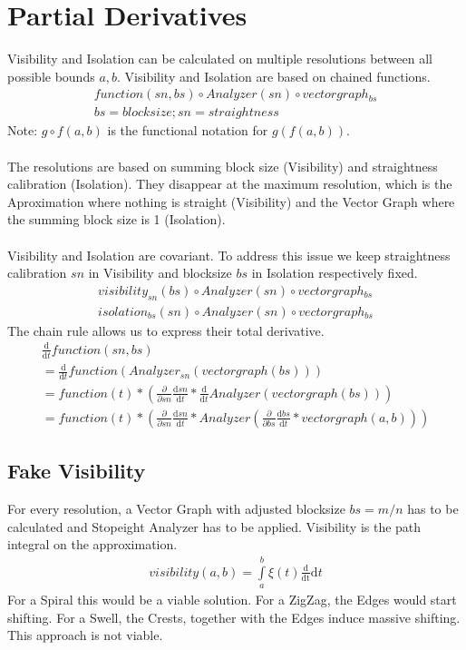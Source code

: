 \documentclass{report}
\begin{document}
\chapter{Partial Derivatives}
Visibility and Isolation can be calculated on multiple resolutions between all possible bounds $a,b$.
Visibility and Isolation are based on chained functions.
\begin{align*}
function(sn,bs) \circ Analyzer(sn) \circ vectorgraph_{bs}\\
bs=blocksize;sn=straightness
\end{align*}
Note: $g \circ f(a,b)$ is the functional notation for $g(f(a,b))$.\\\\
The resolutions are based on summing block size (Visibility) and straightness calibration (Isolation). They disappear at the maximum resolution, which is the Aproximation where nothing is straight (Visibility) and the Vector Graph where the summing block size is 1 (Isolation).\\\\
Visibility and Isolation are covariant. To address this issue we keep straightness calibration $sn$ in Visibility and blocksize $bs$ in Isolation respectively fixed.
\begin{align}
visibility_{sn}(bs) \circ Analyzer(sn) \circ vectorgraph_{bs}\\
isolation_{bs}(sn) \circ Analyzer(sn) \circ vectorgraph_{bs}
\end{align}
The chain rule allows us to express their total derivative.
\begin{align}
\frac{\mathrm{d}}{\mathrm{d} t} function (sn,bs)\\
= \frac{\mathrm{d}}{\mathrm{d} t} function (Analyzer_{sn}(vectorgraph(bs)))\\
= function(t)* (\frac{\partial}{\partial sn}  \frac{\mathrm{d} sn}{\mathrm{d}t} * \frac{\mathrm{d}}{\mathrm{d} t}Analyzer(vectorgraph(bs)))\\
= function(t)* (\frac{\partial}{\partial sn}  \frac{\mathrm{d} sn}{\mathrm{d}t} * Analyzer(\frac{\partial}{\partial bs} \frac{\mathrm{d} bs}{\mathrm{d}t}*vectorgraph(a,b)))
\end{align}



\section{Fake Visibility}
For every resolution, a Vector Graph with adjusted blocksize $bs=m/n$ has to be calculated and Stopeight Analyzer has to be applied.
Visibility is the path integral on the approximation.
\begin{align}
visibility(a,b)=\int \limits _{a}^{b} \xi(t)\frac{\mathrm{d}}{\mathrm{dt}} \mathrm{d}t
\end{align}
For a Spiral this would be a viable solution.
For a ZigZag, the Edges would start shifting.
For a Swell, the Crests, together with the Edges induce massive shifting.
This approach is not viable.
\end{document}
